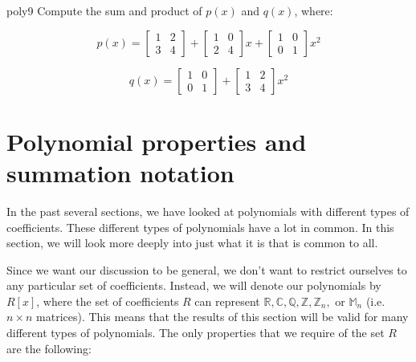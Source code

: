 \begin{exercise}{poly9}
Compute the sum and product of $p(x)$ and $q(x)$, where:

$$p(x)=  \begin{bmatrix} 
1 & 2 \\
3 & 4 
\end{bmatrix}
+\begin{bmatrix} 
1 & 0 \\
2 & 4 
\end{bmatrix}
 x+\begin{bmatrix} 
1 & 0 \\
0 & 1 
\end{bmatrix}
 x^2$$

$$q(x)=  \begin{bmatrix} 
1 & 0 \\
0 & 1 
\end{bmatrix}
+\begin{bmatrix} 
1 & 2 \\
3 & 4 
\end{bmatrix}
 x^2$$
\end{exercise}

\section{ Polynomial properties and summation notation}
\label{sec:Polynomials:PropertiesAndSigmaNotation}

In the past several sections, we have looked at polynomials with different types of coefficients. These different types of polynomials have a lot in common. In this section, we will look more deeply into just what it is that is common to all. 

Since we want our discussion to be general, we don't want to restrict ourselves to any particular set of coefficients.  Instead, we will denote our polynomials by $R[x]$, where the set of coefficients $R$  can represent ${\mathbb R},{\mathbb C},{\mathbb Q},{\mathbb Z},{\mathbb Z}_n,$ or ${\mathbb M}_n$ (i.e. $n \times n$ matrices). This means that the results of this section will be valid for many different types of polynomials.  The only properties that we require of the set $R$ are the following:

